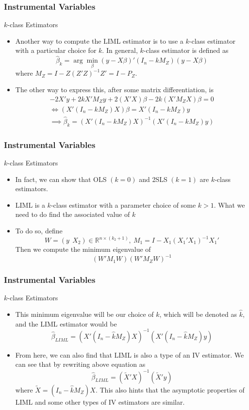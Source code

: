 \documentclass{beamer}
\begin{document}
\begin{frame}
\frametitle{Instrumental Variables}
$k$-class Estimators
\begin{itemize}
\item Another way to compute the LIML estimator is to use a $k$-class estimator with a particular choice for $k$. In general, $k$-class estimator is defined as 
\[
\hat{\beta}_k=\arg\min_\beta(y-X\beta)'(I_n-kM_Z)(y-X\beta)
\]
where $M_Z = I-Z(Z'Z)^{-1}Z'=I-P_Z$.
\item The other way to express this, after some matrix differentiation, is 
\begin{gather*}
-2X'y+2kX'M_Zy+2(X'X)\beta-2k(X'M_ZX)\beta=0\\
\iff (X'(I_n-kM_Z)X)\beta=X'(I_n-kM_Z)y\\
\implies \hat{\beta}_k= (X'(I_n-kM_Z)X)^{-1}(X'(I_n-kM_Z)y)
\end{gather*}
\end{itemize}
\end{frame}

\begin{frame}
\frametitle{Instrumental Variables}
$k$-class Estimators
\begin{itemize}
\item In fact, we can show that OLS $(k=0)$ and 2SLS $(k=1)$ are $k$-class estimators.
\item LIML is a $k$-class estimator with a parameter choice of some $k>1$. What we need to do find the associated value of $k$
\item To do so, define
\[
W=(y\ \ X_2)\in \mathbb{R}^{n\times (k_2+1)}, \ M_1 = I- X_1(X_1'X_1)^{-1}X_1'
\]
Then we compute the minimum eigenvalue of 
\[
(W'M_1W)(W'M_ZW)^{-1}
\]

\end{itemize}
\end{frame}

\begin{frame}
\frametitle{Instrumental Variables}
$k$-class Estimators
\begin{itemize}
\item This minimum eigenvalue will be our choice of $k$, which will be denoted as $\hat{k}$, and the LIML estimator would be
\[
\hat{\beta}_{LIML}=(X'(I_n-\hat{k}M_Z)X)^{-1}(X'(I_n-\hat{k}M_Z)y)
\]
\item From here, we can also find that LIML is also a type of an IV estimator. We can see that by rewriting above equation as
\[
\hat{\beta}_{LIML}=(\tilde{X}'X)^{-1}(\tilde{X}'y)
\]
where $\tilde{X}=(I_n-\hat{k}M_Z)X$. This also hints that the asymptotic properties of LIML and some other types of IV estimators are similar. 
\end{itemize}
\end{frame}
\end{document}
